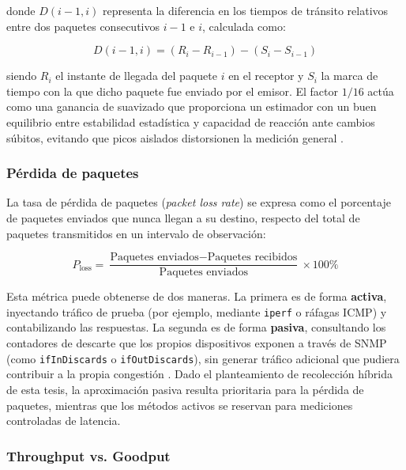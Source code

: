 \documentclass[12pt]{report}
\begin{document}
donde $D(i-1, i)$ representa la diferencia en los tiempos de tránsito relativos entre dos paquetes consecutivos $i-1$ e $i$, calculada como:

\begin{equation}
    D(i-1, i) = \left( R_i - R_{i-1} \right) - \left( S_i - S_{i-1} \right)
    \label{eq:jitter_d}
\end{equation}

siendo $R_i$ el instante de llegada del paquete $i$ en el receptor y $S_i$ la marca de tiempo con la que dicho paquete fue enviado por el emisor. El factor $1/16$ actúa como una ganancia de suavizado que proporciona un estimador con un buen equilibrio entre estabilidad estadística y capacidad de reacción ante cambios súbitos, evitando que picos aislados distorsionen la medición general \cite{rfc3550}. 

\subsubsection*{Pérdida de paquetes}

La tasa de pérdida de paquetes (\textit{packet loss rate}) se expresa como el porcentaje de paquetes enviados que nunca llegan a su destino, respecto del total de paquetes transmitidos en un intervalo de observación:

\begin{equation}
    P_{\mathrm{loss}} = \frac{\mbox{Paquetes enviados} - \mbox{Paquetes recibidos}}{\mbox{Paquetes enviados}} \times 100\%
    \label{eq:packet_loss}
\end{equation}

Esta métrica puede obtenerse de dos maneras. La primera es de forma \textbf{activa}, inyectando tráfico de prueba (por ejemplo, mediante \texttt{iperf} o ráfagas ICMP) y contabilizando las respuestas. La segunda es de forma \textbf{pasiva}, consultando los contadores de descarte que los propios dispositivos exponen a través de SNMP (como \texttt{ifInDiscards} o \texttt{ifOutDiscards}), sin generar tráfico 
adicional que pudiera contribuir a la propia congestión \cite{tanenbaum2011}. Dado el planteamiento de recolección híbrida de esta tesis, la aproximación pasiva resulta prioritaria para la pérdida de paquetes, mientras que los métodos activos se reservan para mediciones controladas de latencia.

\subsubsection*{Throughput vs. Goodput}
\end{document}
